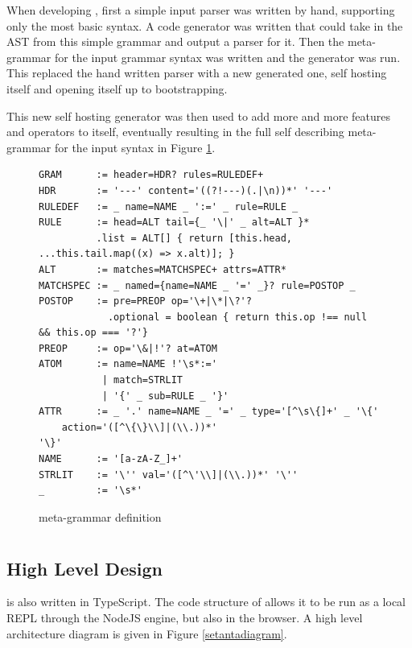 When developing \tsPEG{}, first a simple input parser was written by hand, supporting only the most basic syntax. A code generator was written that could take in the AST from this simple grammar and output a parser for it. Then the meta-grammar for the input grammar syntax was written and the generator was run. This replaced the hand written parser with a new generated one, self hosting itself and opening itself up to bootstrapping.

This new self hosting generator was then used to add more and more features and operators to itself, eventually resulting in the full self describing meta-grammar for the \tsPEG{} input syntax in Figure \ref{tspegsyntax}.

\begin{figure}
    \caption{\tsPEG{} meta-grammar definition}
    \label{tspegsyntax}
    \begin{lstlisting}
GRAM      := header=HDR? rules=RULEDEF+
HDR       := '---' content='((?!---)(.|\n))*' '---'
RULEDEF   := _ name=NAME _ ':=' _ rule=RULE _
RULE      := head=ALT tail={_ '\|' _ alt=ALT }*
          .list = ALT[] { return [this.head, ...this.tail.map((x) => x.alt)]; }
ALT       := matches=MATCHSPEC+ attrs=ATTR*
MATCHSPEC := _ named={name=NAME _ '=' _}? rule=POSTOP _
POSTOP    := pre=PREOP op='\+|\*|\?'?
            .optional = boolean { return this.op !== null && this.op === '?'}
PREOP     := op='\&|!'? at=ATOM
ATOM      := name=NAME !'\s*:='
           | match=STRLIT
           | '{' _ sub=RULE _ '}'
ATTR      := _ '.' name=NAME _ '=' _ type='[^\s\{]+' _ '\{'
    action='([^\{\}\\]|(\\.))*'
'\}'
NAME      := '[a-zA-Z_]+'
STRLIT    := '\'' val='([^\'\\]|(\\.))*' '\''
_         := '\s*'
    \end{lstlisting}
\end{figure}

\section{\Setanta{}}

\subsection{High Level Design}
\Setanta{} is also written in TypeScript. The code structure of \Setanta{} allows it to be run as a local REPL through the NodeJS engine, but also in the browser. A high level architecture diagram is given in Figure \ref{setantadiagram}.

